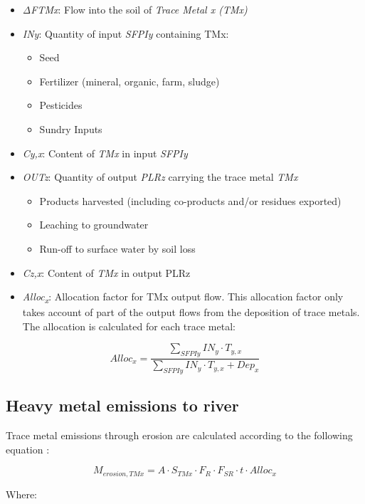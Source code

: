 \documentclass[openany]{book}
\begin{document}
\begin{itemize}
\item
  \emph{ΔFTMx}: Flow into the soil of \emph{Trace Metal x (TMx)}
\item
  \emph{INy}: Quantity of input \emph{SFPIy} containing TMx:

  \begin{itemize}
  \item
    Seed
  \item
    Fertilizer (mineral, organic, farm, sludge)
  \item
    Pesticides
  \item
    Sundry Inputs
  \end{itemize}
\item
  \emph{Cy,x}: Content of \emph{TMx} in input \emph{SFPIy}
\item
  \emph{OUTz}: Quantity of output \emph{PLRz} carrying the trace metal \emph{TMx}

  \begin{itemize}
  \item
    Products harvested (including co-products and/or residues exported)
  \item
    Leaching to groundwater
  \item
    Run-off to surface water by soil loss
  \end{itemize}
\item
  \emph{Cz,x}: Content of \emph{TMx} in output PLRz
\item
  \emph{Alloc\textsubscript{x}}: Allocation factor for TMx output flow. This allocation factor only takes account of part of the output flows from the deposition of trace metals. The allocation is calculated for each trace metal:
\end{itemize}

\[Alloc_x = \frac{ \sum_{SFPIy}IN_y \cdot T_{y,x}}{ \sum_{SFPIy} IN_y \cdot T_{y,x} + Dep_x}\]

\hypertarget{heavy-metal-emissions-to-river}{%
\subsection{Heavy metal emissions to river}\label{heavy-metal-emissions-to-river}}

Trace metal emissions through erosion are calculated according to the following equation \citep{Koch2015}:

\[M_{erosion,TMx} = A \cdot S_{TMx} \cdot F_R \cdot F_{SR} \cdot t \cdot Alloc_x\]

Where:
\end{document}
